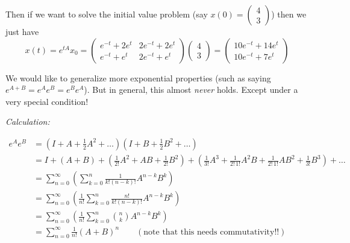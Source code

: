 \documentclass[12pt]{article}
\newenvironment*{tbox}[2][gray]{
    \begin{tcolorbox}[
        parbox=false,
        colback=#1!5!white,
        colframe=#1!75!black,
        breakable,
        title={#2}
    ]}
    {\end{tcolorbox}}
\begin{document}
    Then if we want to solve the initial value problem (say $x(0) = \begin{pmatrix}
        4\\3
    \end{pmatrix}$) then we just have 
    \[x(t) = e^{tA}x_0 =\begin{pmatrix}
        e^{-t} + 2e^t & 2e^{-t} + 2e^t\\ 
        e^{-t} + e^t & 2e^{-t} + e^t
    \end{pmatrix}\begin{pmatrix}
        4\\3
    \end{pmatrix} = \begin{pmatrix}
        10e^{-t} + 14e^t\\ 
        10e^{-t} + 7e^t
    \end{pmatrix}\]

    We would like to generalize more exponential properties (such as saying $e^{A+B} = e^A e^B = e^B e^A$). But in general, this almost \emph{never} holds. Except under a very special condition!

    \begin{tbox}{\textbf{Theorem:} Let $A, B$ be matrices that commute, i.e. $AB = BA$. Then $e^A e^B = e^B e^A = e^{A + B}$}
        \emph{Calculation:}

        \begin{align*}
            e^A e^B &= (I + A + \frac{1}{2}A^2 + \dots)(I + B + \frac{1}{2}B^2 + \dots)\\ 
            &= I + (A + B) + (\frac{1}{2!}A^2 + AB + \frac{1}{2!} B^2) + (\frac{1}{3!}A^3 + \frac{1}{2!\, 1!}A^2B + \frac{1}{2!\, 1!}AB^2 + \frac{1}{3!}B^3) + \dots\\
            &= \sum_{n=0}^{\infty} \left(\sum_{k=0}^n \frac{1}{k!(n - k)!}A^{n-k} B^k\right)\\ 
            &= \sum_{n=0}^{\infty} \left(\frac{1}{n!} \sum_{k=0}^n \frac{n!}{k!(n - k)!}A^{n-k} B^k\right)\\ 
            &= \sum_{n=0}^{\infty} \left(\frac{1}{n!} \sum_{k=0}^n \binom{n}{k}A^{n-k} B^k\right)\\
            &= \sum_{n=0}^{\infty} \frac{1}{n!}(A + B)^n \qquad (\text{note that this needs commutativity!!})
        \end{align*}
    \end{tbox}
\end{document}
